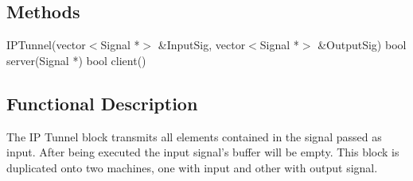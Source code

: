 \subsection*{Methods}
%
IPTunnel(vector$<$Signal *$>$ \&InputSig, vector$<$Signal *$>$ \&OutputSig)
\bigbreak
bool server(Signal *)
\bigbreak
bool client()


\subsection*{Functional Description}

The IP Tunnel block transmits all elements contained in the signal passed as input. After being executed the input signal's buffer will be empty. This block is duplicated onto two machines, one with input and other with output signal.
